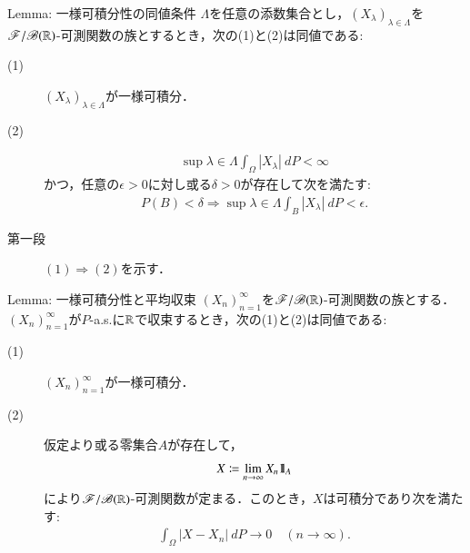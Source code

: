 	\begin{itembox}[l]{Lemma: 一様可積分性の同値条件}
		$\Lambda$を任意の添数集合とし，$(X_\lambda)_{\lambda \in \Lambda}$を
		$\mathscr{F}/\mathscr{B}(\mathbb{R})$-可測関数の族とするとき，次の(1)と(2)は同値である:
		\begin{description}
			\item[(1)] $(X_\lambda)_{\lambda \in \Lambda}$が一様可積分．
			\item[(2)] 
				\begin{align}
					\sup{\lambda \in \Lambda}\int_\Omega |X_\lambda|\ dP < \infty
				\end{align}
				かつ，任意の$\epsilon > 0$に対し或る$\delta > 0$が存在して次を満たす:
				\begin{align}
					P(B) < \delta
					\Rightarrow \sup{\lambda \in \Lambda}\int_B |X_\lambda|\ dP < \epsilon.
				\end{align}
		\end{description}
	\end{itembox}
	
	\begin{prf}\mbox{}
		\begin{description}
			\item[第一段]
				$(1) \Rightarrow (2)$を示す．
		\end{description}
	\end{prf}
	
	\begin{itembox}[l]{Lemma: 一様可積分性と平均収束}\label{lem:uniformly_integrable_and_convergence_in_mean}
		$(X_n)_{n=1}^\infty$を$\mathscr{F}/\mathscr{B}(\mathbb{R})$-可測関数の族とする．
		$(X_n)_{n=1}^\infty$が$P$-a.s.に$\mathbb{R}$で収束するとき，次の(1)と(2)は同値である:
		\begin{description}
			\item[(1)] $(X_n)_{n=1}^\infty$が一様可積分．
			\item[(2)] 仮定より或る零集合$A$が存在して，
				\begin{align}
					X \coloneqq \lim_{n \to \infty} X_n \mbox{1}\hspace{-0.25em}\mbox{l}_A
				\end{align}
				により$\mathscr{F}/\mathscr{B}(\mathbb{R})$-可測関数が定まる．このとき，$X$は可積分であり次を満たす:
				\begin{align}
					\int_\Omega |X - X_n|\ dP 
					\longrightarrow 0
					\quad (n \longrightarrow \infty).
				\end{align}
		\end{description}
	\end{itembox}
	

